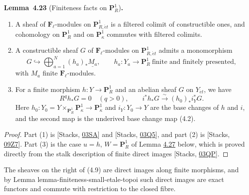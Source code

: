 \documentclass[11pt]{article}
\newenvironment{bpstatement}[2]{\par\addvspace{0.6\baselineskip}\noindent\textbf{#1}#2\textbf{.}\enspace\ignorespaces}
  {\par\addvspace{0.4\baselineskip}}
\newenvironment{bpstatementit}[2]{\begin{bpstatement}{#1}{#2}\itshape\ignorespaces}{\end{bpstatement}}
\begin{document}
\label{bp65}%
\begin{bpstatementit}{Lemma~4.23}{ (Finiteness facts on $\mathbf P^1_R$)}
\begin{enumerate}
\item A sheaf of \(\mathbf F_\ell\)-modules on \(\mathbf P^1_{R,\acute{e}t}\) is a filtered colimit of constructible ones, and cohomology on \(\mathbf P^1_R\) and on \(\mathbf P^1_\kappa\) commutes with filtered colimits.
\item A constructible sheaf \(G\) of \(\mathbf F_\ell\)-modules on \(\mathbf P^1_{R,\acute{e}t}\) admits a monomorphism \[
   G\hookrightarrow
   \bigoplus_{a=1}^N(h_a)_*\underline{M_a},
   \qquad h_a:Y_a\to \mathbf P^1_R\ \text{finite and finitely presented},
   \tag{4.9}
   \] with \(M_a\) finite \(\mathbf F_\ell\)-modules.
\item For a finite morphism \(h:Y\to \mathbf P^1_R\) and an abelian sheaf \(G\) on \(Y_{\acute{e}t}\), we have \[
   R^qh_*G=0\quad(q>0),\qquad
   i^*h_*G\xrightarrow{\sim}(h_0)_*i_Y^*G.
   \tag{4.10}
   \] Here \(h_0:Y_0=Y\times_{\mathbf P^1_R}\mathbf P^1_\kappa\to \mathbf P^1_\kappa\) and \(i_Y:Y_0\to Y\) are the base changes of \(h\) and \(i\), and the second map is the underived base change map (4.2).
\end{enumerate}
\end{bpstatementit}

\begin{proof}[{Proof}]\label{bp66}%
Part (1) is [Stacks, \href{https://stacks.math.columbia.edu/tag/03SA}{03SA}] and [Stacks, \href{https://stacks.math.columbia.edu/tag/03Q5}{03Q5}], and part (2) is [Stacks, \href{https://stacks.math.columbia.edu/tag/09Z7}{09Z7}]. Part (3) is the case \(u=h\), \(W=\mathbf P^1_R\) of Lemma \hyperref[bp80]{4.27} below, which is proved directly from the stalk description of finite direct images [Stacks, \href{https://stacks.math.columbia.edu/tag/03QP}{03QP}].
\end{proof}

\label{bp67}%
The sheaves on the right of (4.9) are direct images along finite morphisms, and by Lemma lemma-finiteness-small-etale-topoi such direct images are exact functors and commute with restriction to the closed fibre.
\end{document}
